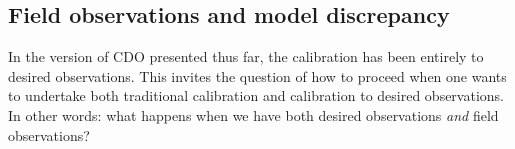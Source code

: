 \documentclass{article}
\begin{document}
%
%
%
%

\subsection{Field observations and model discrepancy}

In the version of CDO presented thus far, the calibration has been entirely to desired observations. This invites the question of how to proceed when one wants to undertake both traditional calibration and calibration to desired observations. In other words: what happens when we have both desired observations \emph{and} field observations? 
\end{document}
